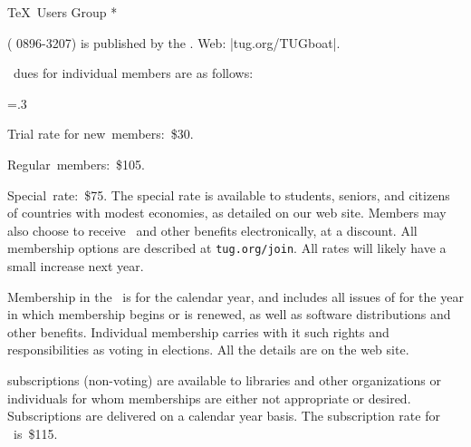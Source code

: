 


\TUBfinal

\def\rateyear{\the\year}
\def\tug{\acro{TUG}}
\def\rtitle{}

\def\USA{U\kern-.12em.\kern.04em S\kern-.06em.\kern.06em A\null.}

\head * \TeX\ Users Group *

\TUB\/ ( 0896-3207) is published by the\newline
\TUG{}. Web: |tug.org/TUGboat|.

\bigskip {}

\noindent
\rateyear\ dues for individual members are as follows:

\begingroup
\raggedstretch=.3\colwd
\raggedright
{}
\item{\bull} Trial rate for new~members:~\$30.
\item{\bull} Regular~members:~\$105.
\item{\bull} Special~rate:~\$75.
\unskip\endgraf
\endgroup       %
\noindent The special rate is available to students, seniors, and
citizens of countries with modest economies, as detailed on our web
site.
Members may also choose to receive \TUB\ and other benefits
electronically, at a discount. All membership options are described at
{\tt tug.org/join}. All rates will likely have a small increase next year.

Membership in the \TUG\ is for the calendar year, and includes all issues
of \TUB\/ for the year in which membership begins or is renewed, as well
as software distributions and other benefits.
Individual membership carries with
it such rights and responsibilities as voting in  elections.
All the details are on the  web site.

\bigskip {}

\noindent \TUB\/ subscriptions (non-voting) are available to libraries
and other organizations or individuals for whom 
memberships are either not appropriate or desired.
Subscriptions are delivered on a calendar year basis.
The subscription rate for
\rateyear\ is~\$115.

